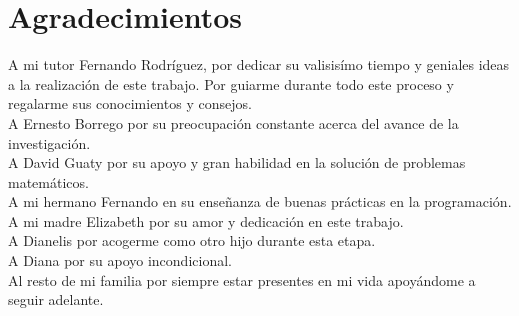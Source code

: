\chapter*{Agradecimientos}\label{chapter:agradecimientos}

A mi tutor Fernando Rodríguez, por dedicar su valisisímo tiempo y geniales ideas a la realización de este trabajo. Por guiarme durante todo este proceso y regalarme sus conocimientos y consejos.
\\

A Ernesto Borrego por su preocupación constante acerca del avance de la investigación.
\\

A David Guaty por su apoyo y gran habilidad en la solución de problemas matemáticos.
\\

A mi hermano Fernando en su enseñanza de buenas prácticas en la programación.
\\

A mi madre Elizabeth por su amor y dedicación en este trabajo.
\\

A Dianelis por acogerme como otro hijo durante esta etapa.
\\

A Diana por su apoyo incondicional.
\\

Al resto de mi familia por siempre estar presentes en mi vida apoyándome a seguir adelante.
